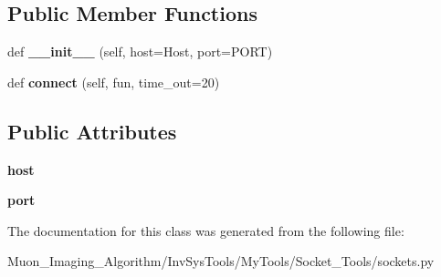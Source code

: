 \subsection*{Public Member Functions}
\begin{DoxyCompactItemize}
\item 
\mbox{\label{classMIS_1_1Muon__Imaging__Algorithm_1_1InvSysTools_1_1MyTools_1_1Socket__Tools_1_1sockets_1_1SocketClient_ad6240eeb23928b62090fb0e9eace2709}} 
def {\bfseries \+\_\+\+\_\+init\+\_\+\+\_\+} (self, host=Host, port=P\+O\+RT)
\item 
\mbox{\label{classMIS_1_1Muon__Imaging__Algorithm_1_1InvSysTools_1_1MyTools_1_1Socket__Tools_1_1sockets_1_1SocketClient_ab092444b6bd9e5dbadc5852c8b76ceff}} 
def {\bfseries connect} (self, fun, time\+\_\+out=20)
\end{DoxyCompactItemize}
\subsection*{Public Attributes}
\begin{DoxyCompactItemize}
\item 
\mbox{\label{classMIS_1_1Muon__Imaging__Algorithm_1_1InvSysTools_1_1MyTools_1_1Socket__Tools_1_1sockets_1_1SocketClient_ac45a2b4db93b1eb913ce2f2986bd96b2}} 
{\bfseries host}
\item 
\mbox{\label{classMIS_1_1Muon__Imaging__Algorithm_1_1InvSysTools_1_1MyTools_1_1Socket__Tools_1_1sockets_1_1SocketClient_aa18985599d30844b768fd3bf3018059f}} 
{\bfseries port}
\end{DoxyCompactItemize}


The documentation for this class was generated from the following file\+:\begin{DoxyCompactItemize}
\item 
Muon\+\_\+\+Imaging\+\_\+\+Algorithm/\+Inv\+Sys\+Tools/\+My\+Tools/\+Socket\+\_\+\+Tools/sockets.\+py\end{DoxyCompactItemize}
